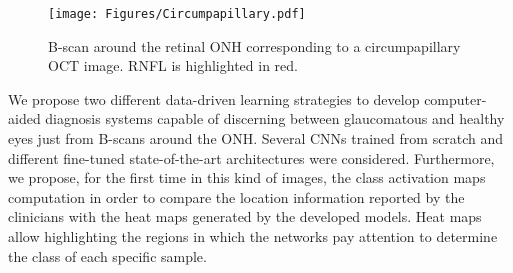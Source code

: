 \begin{figure}[b]
\centering
\texttt{[image: Figures/Circumpapillary.pdf]}
\caption{B-scan around the retinal ONH corresponding to a circumpapillary OCT image. RNFL is highlighted in red.}
\label{fig:circum}
\end{figure}

We propose two different data-driven learning strategies to develop computer-aided diagnosis systems capable of discerning between glaucomatous and healthy eyes just from B-scans around the ONH. Several CNNs trained from scratch and different fine-tuned state-of-the-art architectures were considered. Furthermore, we propose, for the first time in this kind of images, the class activation maps computation in order to compare the location information reported by the clinicians with the heat maps generated by the developed models. Heat maps allow highlighting the regions in which the networks pay attention to determine the class of each specific sample.






